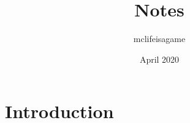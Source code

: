 \documentclass{article}
\title{Notes}
\author{mclifeisagame }
\date{April 2020}
\begin{document}
\maketitle

\section{Introduction}
\end{document}
